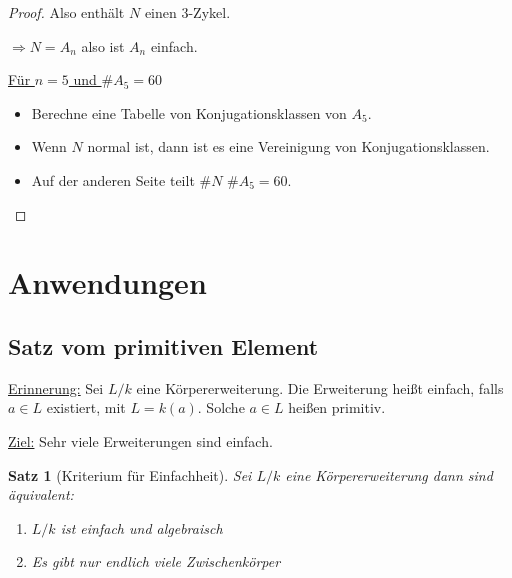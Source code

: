 \documentclass[a4paper,12pt,numbers=noenddot,parskip=full]{scrartcl}
\newcommand{\heading}{\underline}
\theoremstyle{dotless}
\newtheorem{theorem}{Satz}[section]
\theoremstyle{remark}
\begin{document}
\begin{proof}
		Also enthält $N$ einen $3$-Zykel.
		
		$\Rightarrow N = A_n$ also ist $A_n$ einfach.
		
		\heading{Für $n=5$ und $\#A_5 = 60$}
		\begin{itemize}
			\item Berechne eine Tabelle von Konjugationsklassen von $A_5$.
			\item Wenn $N$ normal ist, dann ist es eine Vereinigung von Konjugationsklassen.
			\item Auf der anderen Seite teilt $\#N$ $\#A_5 = 60$.
		\end{itemize}
	\end{proof}

	\section{Anwendungen}
	
	\subsection{Satz vom primitiven Element}
	
	\heading{Erinnerung:} Sei $L/k$ eine Körpererweiterung. Die Erweiterung heißt einfach, falls $a \in L$ existiert, mit $L = k(a)$. Solche $a \in L$ heißen primitiv.
	
	\heading{Ziel:} Sehr viele Erweiterungen sind einfach.
	
	\begin{theorem}[Kriterium für Einfachheit]
		Sei $L/k$ eine Körpererweiterung dann sind äquivalent:
		\begin{enumerate}
			\item $L/k$ ist einfach und algebraisch
			\item Es gibt nur endlich viele Zwischenkörper
		\end{enumerate}
	\end{theorem}
\end{document}
